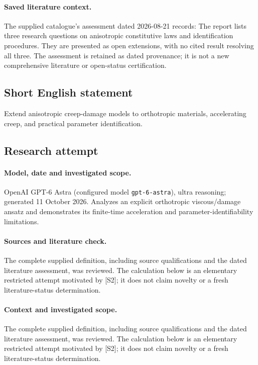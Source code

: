 \documentclass[11pt]{article}
\begin{document}
\paragraph{Saved literature context.} The supplied catalogue's assessment dated 2026-08-21 records: The report lists three research questions on anisotropic constitutive laws and identification procedures. They are presented as open extensions, with no cited result resolving all three. The assessment is retained as dated provenance; it is not a new comprehensive literature or open-status certification.
\subsection{Short English statement}
Extend anisotropic creep-damage models to orthotropic materials, accelerating creep, and practical parameter identification.
\subsection{Research attempt}
\paragraph{Model, date and investigated scope.}
OpenAI GPT-6 Astra (configured model \texttt{gpt-6-astra}), ultra reasoning; generated 11 October 2026. Analyzes an explicit orthotropic viscous/damage ansatz and demonstrates its finite-time acceleration and parameter-identifiability limitations.

\paragraph{Sources and literature check.}
The complete supplied definition, including source qualifications and the dated literature assessment, was reviewed. The calculation below is an elementary restricted attempt motivated by [S2]; it does not claim novelty or a fresh literature-status determination.

\paragraph{Context and investigated scope.} The complete supplied definition, including source qualifications and the dated literature assessment, was reviewed. The calculation below is an elementary restricted attempt motivated by [S2]; it does not claim novelty or a fresh literature-status determination.
\end{document}
